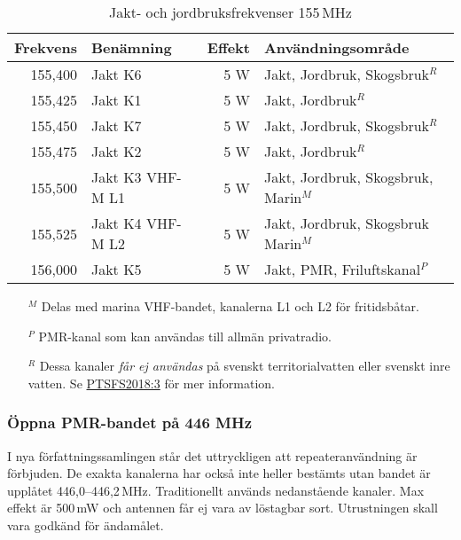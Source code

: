 \begin{table}[H]
\centering
\begin{tabular}{rlrl}
	\textbf{Frekvens} & \textbf{Benämning} & \textbf{Effekt} & \textbf{Användningsområde}           \\ \hline
	          155,400 & Jakt K6            &             5 W & Jakt, Jordbruk, Skogsbruk$^R$        \\
	          155,425 & Jakt K1            &             5 W & Jakt, Jordbruk$^R$                   \\
	          155,450 & Jakt K7            &             5 W & Jakt, Jordbruk, Skogsbruk$^R$        \\
	          155,475 & Jakt K2            &             5 W & Jakt, Jordbruk$^R$                   \\
	          155,500 & Jakt K3 VHF-M L1   &             5 W & Jakt, Jordbruk, Skogsbruk, Marin$^M$ \\
	          155,525 & Jakt K4 VHF-M L2   &             5 W & Jakt, Jordbruk, Skogsbruk Marin$^M$  \\
	          156,000 & Jakt K5            &             5 W & Jakt, PMR, Friluftskanal$^P$
\end{tabular}
\caption{Jakt- och jordbruksfrekvenser 155\,MHz}
\end{table}

\footnotesize
\begin{itemize}
	\item[$^M$] Delas med marina VHF-bandet, kanalerna L1 och L2 för fritidsbåtar.
	\item[$^P$] PMR-kanal som kan användas till allmän privatradio.
	\item[$^R$] Dessa kanaler \textit{får ej användas} på svenskt
          territorialvatten eller svenskt inre vatten. Se
          \href{https://pts.se/globalassets/startpage/dokument/legala-dokument/foreskrifter/radio/beslutade_ptsfs-2018-3-undantagsforeskrifter.pdf}{PTSFS2018:3}
          för mer information.
\end{itemize}
\normalsize

\subsubsection{Öppna PMR-bandet på 446 MHz}

I nya författningssamlingen står det uttryckligen att
repeateranvändning är förbjuden. De exakta kanalerna har också inte
heller bestämts utan bandet är upplåtet
446,0--446,2\,MHz. Traditionellt används nedanstående kanaler. Max
effekt är 500\,mW och antennen får ej vara av löstagbar
sort. Utrustningen skall vara godkänd för ändamålet.

